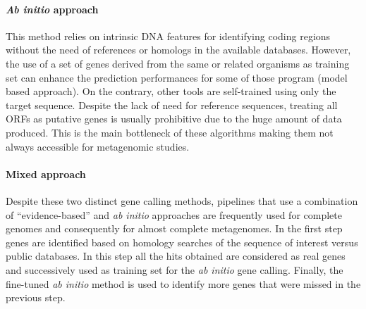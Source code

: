 \paragraph{\textit{Ab initio} approach}
This method relies on intrinsic DNA features for identifying coding regions without the need of references or homologs in the available databases. However, the use of a set of genes derived from the same or related organisms as training set can enhance the prediction performances for some of those program (model based approach). On the contrary, other  tools are self-trained using only the target sequence. Despite the lack of need for reference sequences, treating all ORFs as putative genes is usually prohibitive due to the huge amount of data produced. This is the main bottleneck of these algorithms making them not always accessible for metagenomic studies.\\

\paragraph{Mixed approach}
Despite these two distinct gene calling methods, pipelines that use a combination of ``evidence-based'' and \textit{ab initio} approaches are frequently used for complete genomes and consequently for almost complete metagenomes. In the first step genes are identified based on homology searches of the sequence of interest versus public databases. In this step all the hits obtained are considered as real genes and successively used as training set for the \textit{ab initio} gene calling. Finally, the fine-tuned \textit{ab initio} method is used to identify more genes that were missed in the previous step.\\

